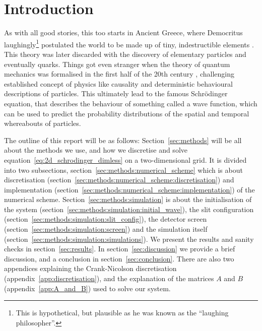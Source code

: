\section{Introduction}\label{sec:introduction}

As with all good stories, this too starts in Ancient Greece, where Democritus laughingly\footnote{This is hypothetical, but plausible as he was known as the ``laughing philosopher''.} postulated the world to be made up of tiny, indestructible elements \citep{berryman_2016}. This theory was later discarded with the discovery of elementary particles and eventually quarks. Things got even stranger when the theory of quantum mechanics was formalised in the first half of the 20th century \citep{QMH}, challenging established concept of physics like causality and deterministic behavioural descriptions of particles. This ultimately lead to the famous Schrödinger equation, that describes the behaviour of something called a wave function, which can be used to predict the probability distributions of the spatial and temporal whereabouts of particles. 

The outline of this report will be as follows: Section~\ref{sec:methods} will be all about the methods we use, and how we discretise and solve equation~\eqref{eq:2d_schrodinger_dimless} on a two-dimensional grid. It is divided into two subsections, section~\ref{sec:methods:numerical_scheme} which is about discretisation (section~\ref{sec:methods:numerical_scheme:discretisation}) and implementation (section~\ref{sec:methods:numerical_scheme:implementation}) of the numerical scheme. Section~\ref{sec:methods:simulation} is about the initialisation of the system (section~\ref{sec:methods:simulation:initial_wave}), the slit configuration (section~\ref{sec:methods:simulation:slit_config}), the detector screen (section~\ref{sec:methods:simulation:screen}) and the simulation itself (section~\ref{sec:methods:simulation:simulations}). We present the results and sanity checks in section~\ref{sec:results}. In section~\ref{sec:discussion} we provide a brief discussion, and a conclusion in section~\ref{sec:conclusion}. There are also two appendices explaining the Crank-Nicolson discretisation (appendix~\ref{app:discretisation}), and the explanation of the matrices $A$ and $B$ (appendix~\ref{app:A_and_B}) used to solve our system. 



